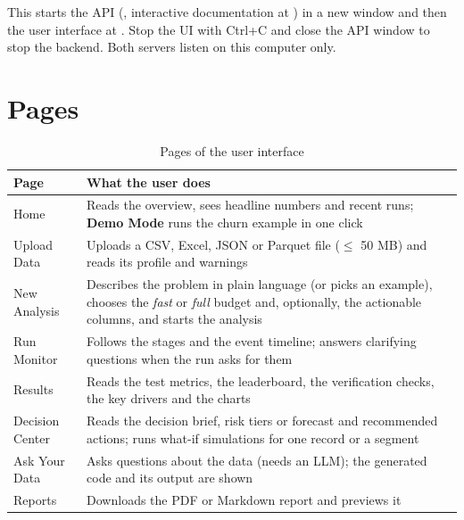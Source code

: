 This starts the API (, interactive documentation at ) in a new window and then the user interface at . Stop the UI with Ctrl+C and close the API window to stop the backend. Both servers listen on this computer only.

\FloatBarrier
\section{Pages}\label{sec:A.4}

\begin{table}[H]
\centering
\linespread{1}\small
\setlength{\tabcolsep}{4pt}
\caption{Pages of the user interface}\label{tab:A.1}
\begin{tabular}{|>{\raggedright\arraybackslash\hspace{0pt}}p{}|>{\raggedright\arraybackslash\hspace{0pt}}p{}|}
\hline
\rowcolor{tableheader}\textbf{Page} & \textbf{What the user does} \\
\hline
Home & Reads the overview, sees headline numbers and recent runs; \textbf{Demo Mode} runs the churn example in one click \\ \hline
Upload Data & Uploads a CSV, Excel, JSON or Parquet file (\ensuremath{\leq} 50 MB) and reads its profile and warnings \\ \hline
New Analysis & Describes the problem in plain language (or picks an example), chooses the \textit{fast} or \textit{full} budget and, optionally, the actionable columns, and starts the analysis \\ \hline
Run Monitor & Follows the stages and the event timeline; answers clarifying questions when the run asks for them \\ \hline
Results & Reads the test metrics, the leaderboard, the verification checks, the key drivers and the charts \\ \hline
Decision Center & Reads the decision brief, risk tiers or forecast and recommended actions; runs what-if simulations for one record or a segment \\ \hline
Ask Your Data & Asks questions about the data (needs an LLM); the generated code and its output are shown \\ \hline
Reports & Downloads the PDF or Markdown report and previews it \\ \hline
\end{tabular}
\end{table}

